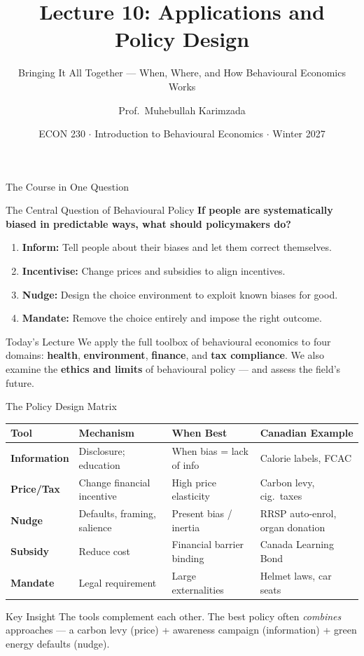 \documentclass[aspectratio=169]{beamer}
\title{\textbf{Lecture 10: Applications and Policy Design}}
\subtitle{Bringing It All Together --- When, Where, and How Behavioural Economics Works}
\author{Prof.\ Muhebullah Karimzada}
\institute{School of Economics, University of Northern British Columbia}
\date{ECON 230 $\cdot$ Introduction to Behavioural Economics $\cdot$ Winter 2027}
\begin{document}
\begin{frame}[plain]\titlepage\end{frame}

\begin{frame}{The Course in One Question}
\begin{alertblock}{The Central Question of Behavioural Policy}
\textbf{If people are systematically biased in predictable ways, what should policymakers do?}
\begin{enumerate}
  \item \textbf{Inform:} Tell people about their biases and let them correct themselves.
  \item \textbf{Incentivise:} Change prices and subsidies to align incentives.
  \item \textbf{Nudge:} Design the choice environment to exploit known biases for good.
  \item \textbf{Mandate:} Remove the choice entirely and impose the right outcome.
\end{enumerate}
\end{alertblock}
\begin{block}{Today's Lecture}
We apply the full toolbox of behavioural economics to four domains: \textbf{health}, \textbf{environment}, \textbf{finance}, and \textbf{tax compliance}. We also examine the \textbf{ethics and limits} of behavioural policy --- and assess the field's future.
\end{block}
\end{frame}

\begin{frame}{The Policy Design Matrix}
\begin{center}\small
\begin{tabular}{p{1.8cm}p{3.2cm}p{3.2cm}p{2.8cm}}
\toprule
\textbf{Tool} & \textbf{Mechanism} & \textbf{When Best} & \textbf{Canadian Example}\\
\midrule
\textbf{Information} & Disclosure; education & When bias = lack of info & Calorie labels, FCAC\\
\textbf{Price/Tax} & Change financial incentive & High price elasticity & Carbon levy, cig.\ taxes\\
\rowcolor{softpurple}
\textbf{Nudge} & Defaults, framing, salience & Present bias / inertia & RRSP auto-enrol, organ donation\\
\textbf{Subsidy} & Reduce cost & Financial barrier binding & Canada Learning Bond\\
\textbf{Mandate} & Legal requirement & Large externalities & Helmet laws, car seats\\
\bottomrule
\end{tabular}
\end{center}
\begin{exampleblock}{Key Insight}
The tools complement each other. The best policy often \textit{combines} approaches --- a carbon levy (price) + awareness campaign (information) + green energy defaults (nudge).
\end{exampleblock}
\end{frame}
\end{document}
